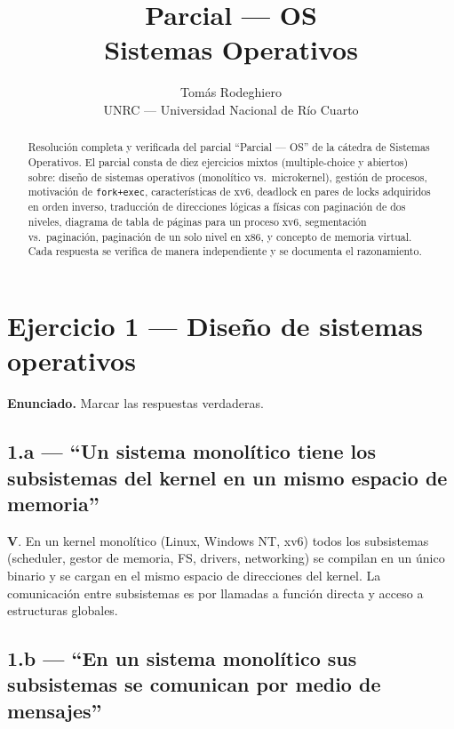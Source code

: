 \documentclass[11pt,a4paper]{article}
\title{
    \vspace{-2.5em}
    \textbf{Parcial --- OS} \\[0.3em]
    \large Sistemas Operativos
}
\author{
    Tomás Rodeghiero \\
    \small UNRC --- Universidad Nacional de Río Cuarto
}
\date{}
\begin{document}
\maketitle

\begin{abstract}
\noindent
Resolución completa y verificada del parcial ``Parcial --- OS'' de
la cátedra de Sistemas Operativos. El parcial consta de diez
ejercicios mixtos (multiple-choice y abiertos) sobre: diseño de
sistemas operativos (monolítico vs.\ microkernel), gestión de
procesos, motivación de \texttt{fork+exec}, características de xv6,
deadlock en pares de locks adquiridos en orden inverso, traducción
de direcciones lógicas a físicas con paginación de dos niveles,
diagrama de tabla de páginas para un proceso xv6, segmentación vs.\
paginación, paginación de un solo nivel en x86, y concepto de
memoria virtual. Cada respuesta se verifica de manera independiente
y se documenta el razonamiento.
\end{abstract}

\tableofcontents
\bigskip

\section{Ejercicio 1 --- Diseño de sistemas operativos}

\textbf{Enunciado.} Marcar las respuestas verdaderas.

\subsection*{1.a --- ``Un sistema monolítico tiene los subsistemas del kernel en un mismo espacio de memoria''}

\begin{respuesta}
\textbf{V}. En un kernel monolítico (Linux, Windows NT, xv6) todos
los subsistemas (scheduler, gestor de memoria, FS, drivers,
networking) se compilan en un único binario y se cargan en el mismo
espacio de direcciones del kernel. La comunicación entre subsistemas
es por llamadas a función directa y acceso a estructuras globales.
\end{respuesta}

\subsection*{1.b --- ``En un sistema monolítico sus subsistemas se comunican por medio de mensajes''}
\end{document}
